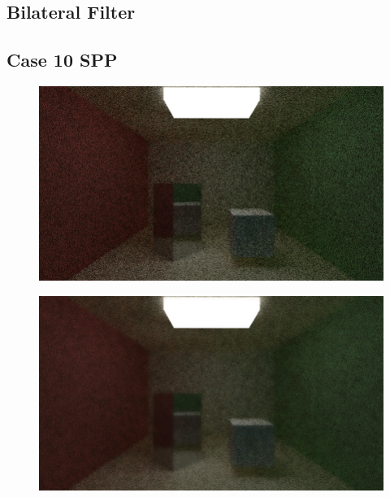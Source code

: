 \documentclass[titlepage,12pt]{report}
\begin{document}
\begin{appendices}
\section{Bilateral Filter}

\subsection{Case 10 SPP}
\begin{figure}[H]
	\centering
	\includegraphics[scale=0.5]{media/bilateral/cornell_normal_10_bilateral_filter_21_5_10.png}
	\label{ap17}
\end{figure}

\begin{figure}[H]
	\centering
	\includegraphics[scale=0.5]{media/bilateral/cornell_normal_10_bilateral_filter_21_5_20.png}
	\label{ap18}
\end{figure}


\end{appendices}
\end{document}
